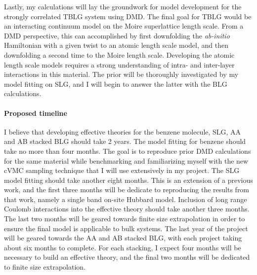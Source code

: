 \documentclass[12pt]{article}
\begin{document}
Lastly, my calculations will lay the groundwork for model development for the strongly correlated TBLG system using DMD.
The final goal for TBLG would be an interacting continuum model on the Moire superlattice length scale.
From a DMD perspective, this can accomplished by first downfolding the \textit{ab-initio} Hamiltonian with a given twist to an atomic length scale model, and then downfolding a second time to the Moire length scale.
Developing the atomic length scale models requires a strong understanding of intra- and inter-layer interactions in this material.
The prior will be thoroughly investigated by my model fitting on SLG, and I will begin to answer the latter with the BLG calculations.

\paragraph{Proposed timeline} I believe that developing effective theories for the benzene molecule, SLG, AA and AB stacked BLG should take 2 years. 
The model fitting for benzene should take no more than four months.
The goal is to reproduce prior DMD calculations for the same material while benchmarking and familiarizing myself with the new cVMC sampling technique that I will use extensively in my project.
The SLG model fitting should take another eight months.
This is an extension of a previous work, and the first three months will be dedicate to reproducing the results from that work, namely a single band on-site Hubbard model.
Inclusion of long range Coulomb interactions into the effective theory should take another three months.
The last two months will be geared towards finite size extrapolation in order to ensure the final model is applicable to bulk systems.
The last year of the project will be geared towards the AA and AB stacked BLG, with each project taking about six months to complete.
For each stacking, I expect four months will be necessary to build an effective theory, and the final two months will be dedicated to finite size extrapolation.

\begin{multicols}{2}
\begin{spacing}{0.5}
{\fontsize{10}{5}\selectfont


}
\end{spacing}
\end{multicols}
\end{document}
